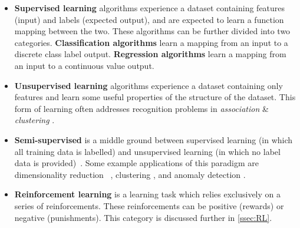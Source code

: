 \begin{itemize}
    \item \textbf{Supervised learning} algorithms experience a dataset
    containing features (input) and labels (expected output), and are expected
    to learn a function mapping between the two. These algorithms can be further
    divided into two categories. \textbf{Classification algorithms} learn a
    mapping from an input to a discrete class label output. \textbf{Regression
    algorithms} learn a mapping from an input to a continuous value output.


    \item \textbf{Unsupervised learning} algorithms experience a dataset
    containing only features and learn some useful properties of the structure
    of the dataset. This form of learning often addresses recognition problems
    in \textit{association} \& \textit{clustering} \cite{barlow1999ul}.

    \item \textbf{Semi-supervised} is a middle ground between supervised
    learning (in which all training data is labelled) and unsupervised learning
    (in which no label data is provided)~\cite{books/mit/06/CSZ2006}. Some
    example applications of this paradigm are dimensionality reduction
    ~\cite{Zhang2007}, clustering \cite{Bair2013}, and anomaly detection
    \cite{DBLP:journals/corr/abs-1805-06725}.

    \item \textbf{Reinforcement learning} is a learning task which relies
    exclusively on a series of reinforcements. These reinforcements can be
    positive (rewards) or negative (punishments). This category is discussed
    further in \autoref{ssec:RL}.
\end{itemize}

